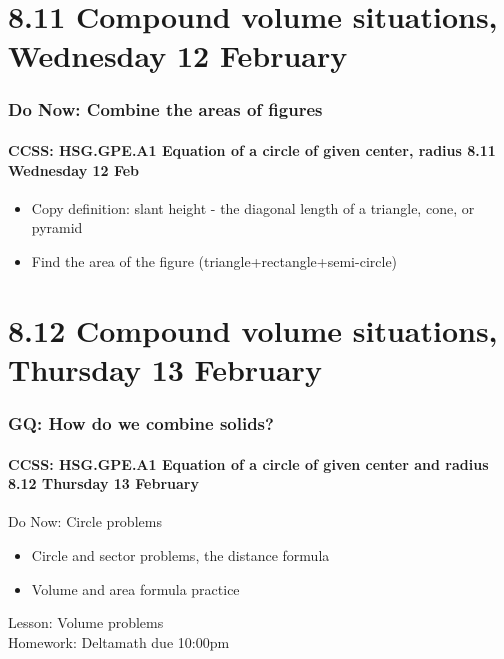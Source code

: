 \documentclass{beamer}
\begin{document}
\section{8.11 Compound volume situations, Wednesday 12 February}
\frame
{
  \frametitle{Do Now: Combine the areas of figures}
  \framesubtitle{CCSS: HSG.GPE.A1 Equation of a circle of given center, radius \hfill \alert{8.11 Wednesday 12 Feb}}

  \begin{itemize}
    \item Copy definition: \alert{slant height} - the diagonal length of a triangle, cone, or pyramid
    \item Find the area of the figure (triangle+rectangle+semi-circle)
  \end{itemize}
  \begin{flushright}
  \end{flushright}
}

\section{8.12 Compound volume situations, Thursday 13 February}
\frame
{
  \frametitle{GQ: How do we combine solids?}
  \framesubtitle{CCSS: HSG.GPE.A1 Equation of a circle of given center and radius \hfill \alert{8.12 Thursday 13 February}}

  \begin{block}{Do Now: Circle problems}
  \begin{itemize}
    \item Circle and sector problems, the distance formula
    \item Volume and area formula practice
  \end{itemize}
  \end{block}
  Lesson: Volume problems\\[5pt]
  Homework: Deltamath due 10:00pm
}
\end{document}
